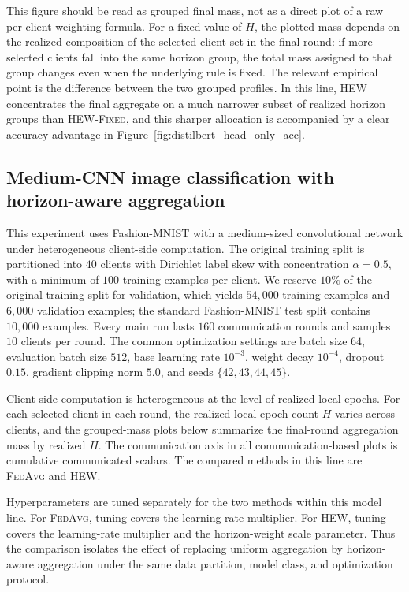 \documentclass{article}
\theoremstyle{definition}
\begin{document}
This figure should be read as grouped final mass, not as a direct plot of a raw per-client weighting formula. For a fixed value of \(H\), the plotted mass depends on the realized composition of the selected client set in the final round: if more selected clients fall into the same horizon group, the total mass assigned to that group changes even when the underlying rule is fixed. The relevant empirical point is the difference between the two grouped profiles. In this line, \textsc{HEW} concentrates the final aggregate on a much narrower subset of realized horizon groups than \textsc{HEW-Fixed}, and this sharper allocation is accompanied by a clear accuracy advantage in Figure~\ref{fig:distilbert_head_only_acc}.




\subsection{Medium-CNN image classification with horizon-aware aggregation}

This experiment uses Fashion-MNIST \cite{fashionmnist} with a medium-sized convolutional network under heterogeneous client-side computation. The original training split is partitioned into \(40\) clients with Dirichlet label skew with concentration \(\alpha=0.5\), with a minimum of \(100\) training examples per client. We reserve \(10\%\) of the original training split for validation, which yields \(54{,}000\) training examples and \(6{,}000\) validation examples; the standard Fashion-MNIST test split contains \(10{,}000\) examples. Every main run lasts \(160\) communication rounds and samples \(10\) clients per round. The common optimization settings are batch size \(64\), evaluation batch size \(512\), base learning rate \(10^{-3}\), weight decay \(10^{-4}\), dropout \(0.15\), gradient clipping norm \(5.0\), and seeds \(\{42,43,44,45\}\).

Client-side computation is heterogeneous at the level of realized local epochs. For each selected client in each round, the realized local epoch count \(H\) varies across clients, and the grouped-mass plots below summarize the final-round aggregation mass by realized \(H\). The communication axis in all communication-based plots is cumulative communicated scalars. The compared methods in this line are \textsc{FedAvg} and \textsc{HEW}.

Hyperparameters are tuned separately for the two methods within this model line. For \textsc{FedAvg}, tuning covers the learning-rate multiplier. For \textsc{HEW}, tuning covers the learning-rate multiplier and the horizon-weight scale parameter. Thus the comparison isolates the effect of replacing uniform aggregation by horizon-aware aggregation under the same data partition, model class, and optimization protocol.
\end{document}
